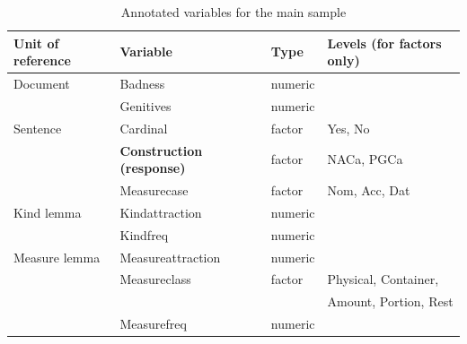 \documentclass[USenglish]{article}
\begin{document}
\begin{table}
  \centering
  \begin{tabular}{llll}
    Unit of reference & Variable                      & Type    & Levels (for factors only) \\
    \midrule
    Document       & Badness                          & numeric &                           \\
                   & Genitives                        & numeric &                           \\
    Sentence       & Cardinal                         & factor  & Yes, No                   \\
                   & \textbf{Construction (response)} & factor  & NACa, PGCa                \\
                   & Measurecase                      & factor  & Nom, Acc, Dat             \\
    Kind lemma     & Kindattraction                   & numeric &                           \\
                   & Kindfreq                         & numeric &                           \\
    Measure lemma  & Measureattraction                & numeric &                           \\
                   & Measureclass                     & factor  & Physical, Container,      \\
                   &                                  &         & Amount, Portion, Rest     \\
                   & Measurefreq                      & numeric &                           \\
  \end{tabular}
  \caption{Annotated variables for the main sample}
  \label{tab:variables}
\end{table}
\end{document}
